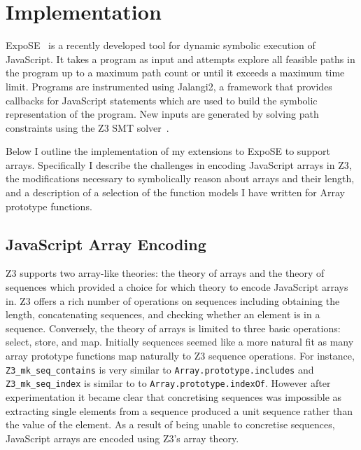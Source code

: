 \documentclass[]{final_report}
\begin{document}
\chapter{Implementation} \label{sec:implementation}

ExpoSE~\cite{DBLP:conf/spin/2017} is a recently developed tool for dynamic symbolic execution of JavaScript. It takes a program as input and attempts explore all feasible paths in the program up to a maximum path count or until it exceeds a maximum time limit. Programs are instrumented using Jalangi2, a framework that provides callbacks for JavaScript statements which are used to build the symbolic representation of the program. New inputs are generated by solving path constraints using the Z3 SMT solver~\cite{de2008z3}.

Below I outline the implementation of my extensions to ExpoSE to support arrays. Specifically I describe the challenges in encoding JavaScript arrays in Z3, the modifications necessary to symbolically reason about arrays and their length, and a description of a selection of the function models I have written for Array prototype functions.

\section{JavaScript Array Encoding}
Z3 supports two array-like theories: the theory of arrays and the theory of sequences which provided a choice for which theory to encode JavaScript arrays in. Z3 offers a rich number of operations on sequences including obtaining the length, concatenating sequences, and checking whether an element is in a sequence. Conversely, the theory of arrays is limited to three basic operations: select, store, and map. Initially sequences seemed like a more natural fit as many array prototype functions map naturally to Z3 sequence operations. For instance, \lstinline|Z3_mk_seq_contains| is very similar to \lstinline|Array.prototype.includes| and \lstinline|Z3_mk_seq_index| is similar to to \lstinline|Array.prototype.indexOf|. However after experimentation it became clear that concretising sequences was impossible as extracting single elements from a sequence produced a unit sequence rather than the value of the element. As a result of being unable to concretise sequences, JavaScript arrays are encoded using Z3's array theory. 
\end{document}

